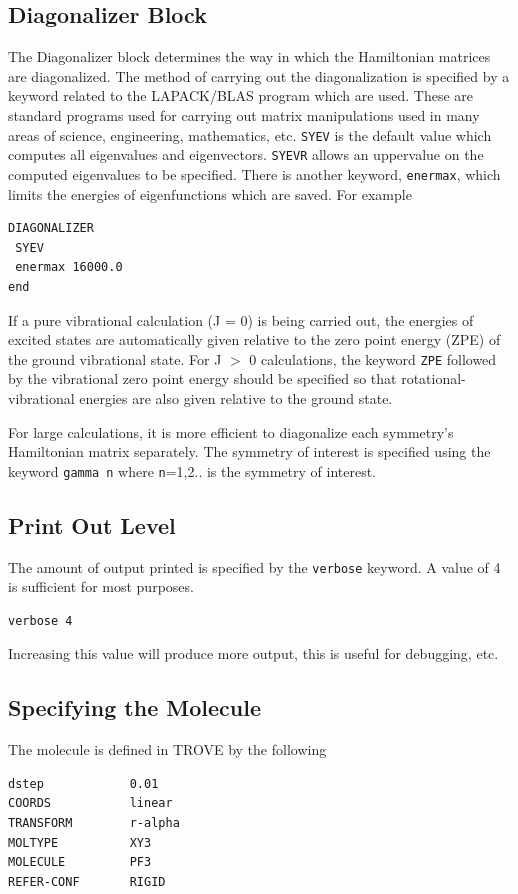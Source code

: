 \subsection{Diagonalizer Block}
The Diagonalizer block determines the way in which the Hamiltonian matrices are diagonalized. 
The method of carrying out the diagonalization is specified by a keyword related to the LAPACK/BLAS program which are used.
These are standard programs used for carrying out matrix manipulations used in many areas of science, engineering, mathematics,
etc. 
\verb|SYEV| is the default value which computes all eigenvalues and eigenvectors. \verb|SYEVR| allows an uppervalue on the computed eigenvalues to be specified.
There is another keyword, \verb|enermax|, which limits the energies of eigenfunctions which are saved. For example
\begin{verbatim}
DIAGONALIZER
 SYEV
 enermax 16000.0
end
\end{verbatim}
If a pure vibrational calculation (J = 0) is being carried out, 
the energies of excited states are automatically given relative to the zero point energy (ZPE) of the ground vibrational state. 
For J $>$ 0 calculations, the keyword \verb|ZPE| followed by the vibrational zero point energy should be specified 
so that rotational-vibrational energies are also given relative to the ground state.

For large calculations, it is more efficient to diagonalize each symmetry's Hamiltonian matrix separately. The symmetry of 
interest is specified using the keyword \verb|gamma n| where \verb|n|=1,2.. is the symmetry of interest.

\subsection{Print Out Level}

The amount of output printed is specified by the \verb|verbose| keyword. A value of 4 is sufficient for most purposes.
\begin{verbatim}
verbose 4
\end{verbatim}
Increasing this value will produce more output, this is useful for debugging, etc.

\subsection{Specifying the Molecule}
The molecule is defined in TROVE by the following
\begin{verbatim}
dstep            0.01
COORDS           linear
TRANSFORM        r-alpha
MOLTYPE          XY3
MOLECULE         PF3
REFER-CONF       RIGID
\end{verbatim}

